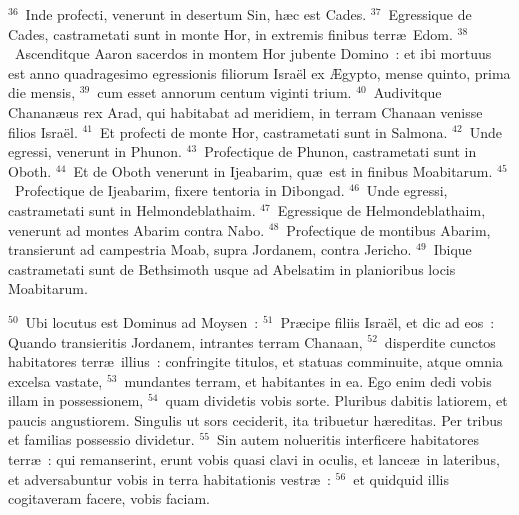${}^{36}$~Inde profecti, venerunt in desertum Sin, h\ae c est Cades.
${}^{37}$~Egressique de Cades, castrametati sunt in monte Hor, in extremis finibus terr\ae\ Edom.
${}^{38}$~Ascenditque Aaron sacerdos in montem Hor jubente Domino~: et ibi mortuus est anno quadragesimo egressionis filiorum Isra\"el ex \AE gypto, mense quinto, prima die mensis,
${}^{39}$~cum esset annorum centum viginti trium.
${}^{40}$~Audivitque Chanan\ae us rex Arad, qui habitabat ad meridiem, in terram Chanaan venisse filios Isra\"el.
${}^{41}$~Et profecti de monte Hor, castrametati sunt in Salmona.
${}^{42}$~Unde egressi, venerunt in Phunon.
${}^{43}$~Profectique de Phunon, castrametati sunt in Oboth.
${}^{44}$~Et de Oboth venerunt in Ijeabarim, qu\ae\ est in finibus Moabitarum.
${}^{45}$~Profectique de Ijeabarim, fixere tentoria in Dibongad.
${}^{46}$~Unde egressi, castrametati sunt in Helmondeblathaim.
${}^{47}$~Egressique de Helmondeblathaim, venerunt ad montes Abarim contra Nabo.
${}^{48}$~Profectique de montibus Abarim, transierunt ad campestria Moab, supra Jordanem, contra Jericho.
${}^{49}$~Ibique castrametati sunt de Bethsimoth usque ad Abelsatim in planioribus locis Moabitarum.


${}^{50}$~Ubi locutus est Dominus ad Moysen~:
${}^{51}$~Pr\ae cipe filiis Isra\"el, et dic ad eos~: Quando transieritis Jordanem, intrantes terram Chanaan,
${}^{52}$~disperdite cunctos habitatores terr\ae\ illius~: confringite titulos, et statuas comminuite, atque omnia excelsa vastate,
${}^{53}$~mundantes terram, et habitantes in ea. Ego enim dedi vobis illam in possessionem,
${}^{54}$~quam dividetis vobis sorte. Pluribus dabitis latiorem, et paucis angustiorem. Singulis ut sors ceciderit, ita tribuetur h\ae reditas. Per tribus et familias possessio dividetur.
${}^{55}$~Sin autem nolueritis interficere habitatores terr\ae~: qui remanserint, erunt vobis quasi clavi in oculis, et lance\ae\ in lateribus, et adversabuntur vobis in terra habitationis vestr\ae~:
${}^{56}$~et quidquid illis cogitaveram facere, vobis faciam.

